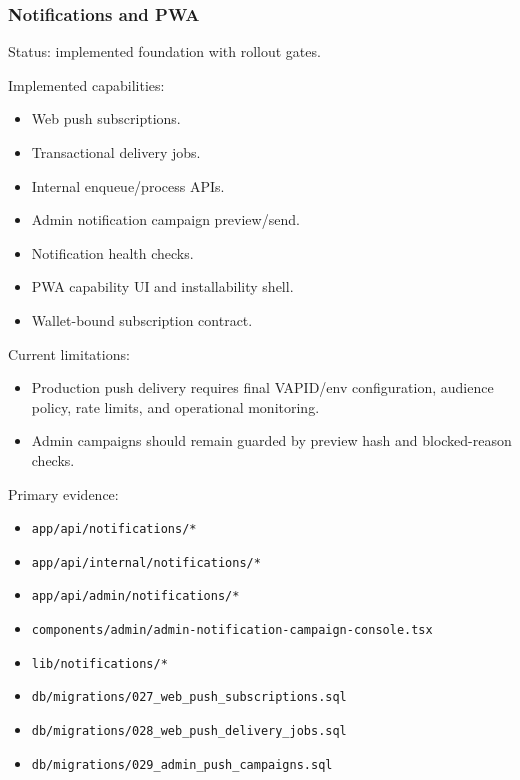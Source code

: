 \documentclass[
  10pt,
  letterpaper,
]{article}
\providecommand{\tightlist}{%
  \setlength{\itemsep}{0pt}\setlength{\parskip}{0pt}}
\let\oldtexttt\texttt
\renewcommand{\texttt}[1]{\oldtexttt{\small #1}}
\begin{document}
\subsubsection{Notifications and PWA}\label{notifications-and-pwa}

Status: implemented foundation with rollout gates.

Implemented capabilities:

\begin{itemize}
\tightlist
\item
  Web push subscriptions.
\item
  Transactional delivery jobs.
\item
  Internal enqueue/process APIs.
\item
  Admin notification campaign preview/send.
\item
  Notification health checks.
\item
  PWA capability UI and installability shell.
\item
  Wallet-bound subscription contract.
\end{itemize}

Current limitations:

\begin{itemize}
\tightlist
\item
  Production push delivery requires final VAPID/env configuration,
  audience policy, rate limits, and operational monitoring.
\item
  Admin campaigns should remain guarded by preview hash and
  blocked-reason checks.
\end{itemize}

Primary evidence:

\begin{itemize}
\tightlist
\item
  \texttt{app/api/notifications/*}
\item
  \texttt{app/api/internal/notifications/*}
\item
  \texttt{app/api/admin/notifications/*}
\item
  \texttt{components/admin/admin-notification-campaign-console.tsx}
\item
  \texttt{lib/notifications/*}
\item
  \texttt{db/migrations/027\_web\_push\_subscriptions.sql}
\item
  \texttt{db/migrations/028\_web\_push\_delivery\_jobs.sql}
\item
  \texttt{db/migrations/029\_admin\_push\_campaigns.sql}
\end{itemize}
\end{document}
